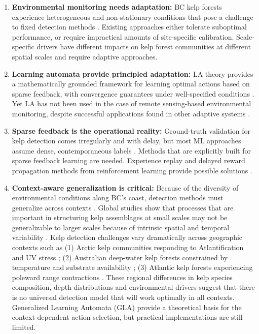 \documentclass[12pt,oneside]{book}
\begin{document}
\begin{enumerate}
    \item \textbf{Environmental monitoring needs adaptation:} BC kelp forests experience heterogeneous and non-stationary conditions that pose a challenge to fixed detection methods \citep{Starko2024, MoraSoto2024, Hollarsmith2022}. Existing approaches either tolerate suboptimal performance, or require impractical amounts of site-specific calibration. Scale-specific drivers have different impacts on kelp forest communities at different spatial scales \citep{Lamy2018} and require adaptive approaches.

    \item \textbf{Learning automata provide principled adaptation:} LA theory provides a mathematically grounded framework for learning optimal actions based on sparse feedback, with convergence guarantees under well-specified conditions \citep{Narendra1989, ThathacharSastry2002}. Yet LA has not been used in the case of remote sensing-based environmental monitoring, despite successful applications found in other adaptive systems \citep{BenZvi2018, Nicopolitidis2011}.

    \item \textbf{Sparse feedback is the operational reality:} Ground-truth validation for kelp detection comes irregularly and with delay, but most ML approaches assume dense, contemporaneous labels \citep{Ma2019}. Methods that are explicitly built for sparse feedback learning are needed. Experience replay and delayed reward propagation methods from reinforcement learning provide possible solutions \citep{SuttonBarto2018}.

    \item \textbf{Context-aware generalization is critical:} Because of the diversity of environmental conditions along BC's coast, detection methods must generalize across contexts \citep{BeasLuna2020, Schroeder2020}. Global studies show that processes that are important in structuring kelp assemblages at small scales may not be generalizable to larger scales because of intrinsic spatial and temporal variability \citep{Marzinelli2015, UnderwoodPetraitis1993}. Kelp detection challenges vary dramatically across geographic contexts such as (1) Arctic kelp communities responding to Atlantification and UV stress \citep{Bischof2019}; (2) Australian deep-water kelp forests constrained by temperature and substrate availability \citep{Marzinelli2015, ConnellIrving2008}; (3) Atlantic kelp forests experiencing poleward range contractions \citep{Voerman2013, Wernberg2012}. These regional differences in kelp species composition, depth distributions and environmental drivers suggest that there is no universal detection model that will work optimally in all contexts. Generalized Learning Automata (GLA) provide a theoretical basis for the context-dependent action selection, but practical implementations are still limited.


\end{enumerate}
\end{document}

